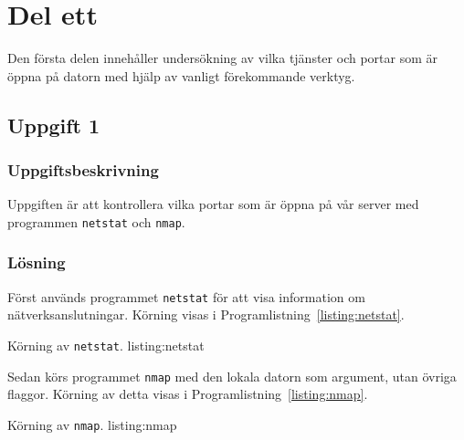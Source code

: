 %
%
%


\section{Del ett}
Den första delen innehåller undersökning av vilka tjänster och portar som är
öppna på datorn med hjälp av vanligt förekommande verktyg.


\subsection{Uppgift 1}
\subsubsection{Uppgiftsbeskrivning}
Uppgiften är att kontrollera vilka portar som är öppna på vår server med
programmen \texttt{netstat} och \texttt{nmap}.


\subsubsection{Lösning}
Först används programmet \texttt{netstat} för att visa information om
nätverksanslutningar. Körning visas i Programlistning~\ref{listing:netstat}.

            {Körning av \texttt{netstat}.}
            {listing:netstat}


Sedan körs programmet \texttt{nmap} med den lokala datorn som argument, utan
övriga flaggor. Körning av detta visas i Programlistning~\ref{listing:nmap}.

            {Körning av \texttt{nmap}.}
            {listing:nmap}


